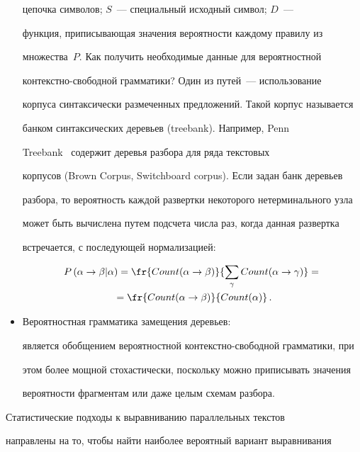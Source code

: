 \begin{multicols}{2}
\begin{itemize}
цепочка символов; $S$~--- специальный исходный символ; $D$~---


функция, приписывающая значения вероятности каж\-до\-му правилу из


множества~$P$. Как получить необходимые данные для вероятностной


контекстно-свободной грамматики? Один из путей~--- использование


корпуса синтаксически размеченных предложений. Такой корпус называется


банком синтаксических деревьев (treebank). Например, Penn


Treebank~\cite{37koz}  содержит деревья разбора для ряда текстовых


корпусов (Brown Corpus, Switchboard corpus). Если задан банк деревьев


разбора, то вероятность каж\-дой развертки некоторого нетерминального узла


может быть вычислена путем подсчета числа раз, когда данная развертка


встречается, с последующей нормализацией:


\begin{multline*}


P\left(\alpha\rightarrow \beta \vert \alpha\right) = \fr{Count (\alpha 


\rightarrow \beta


)}{\sum_\gamma Count (\alpha \rightarrow \gamma )} ={}\\


{}= \fr{Count (\alpha\rightarrow \beta )}{Count (\alpha )}\,. 


\end{multline*}


\item Вероятностная грамматика замещения деревьев:


является обобщением вероятностной контекстно-свободной грамматики, при


этом более мощной стохастически, поскольку можно приписывать значения


вероятности фрагментам или даже целым схемам разбора.


\end{itemize}





Статистические подходы к выравниванию параллельных текстов


направлены на то, чтобы найти наиболее вероятный вариант выравнивания



\end{multicols}
